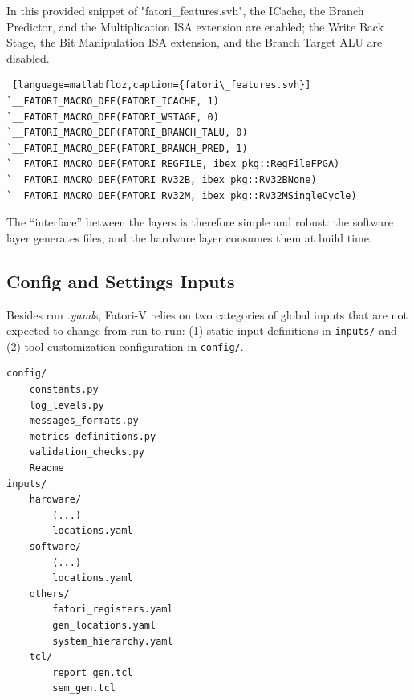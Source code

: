  In this provided snippet of "fatori\_features.svh", the ICache, the Branch Predictor, and the Multiplication ISA extension are enabled; the Write Back Stage, the Bit Manipulation ISA extension, and the Branch Target ALU are disabled.

\begin{lstlisting} [language=matlabfloz,caption={fatori\_features.svh}]
`__FATORI_MACRO_DEF(FATORI_ICACHE, 1)
`__FATORI_MACRO_DEF(FATORI_WSTAGE, 0)
`__FATORI_MACRO_DEF(FATORI_BRANCH_TALU, 0)
`__FATORI_MACRO_DEF(FATORI_BRANCH_PRED, 1)
`__FATORI_MACRO_DEF(FATORI_REGFILE, ibex_pkg::RegFileFPGA)
`__FATORI_MACRO_DEF(FATORI_RV32B, ibex_pkg::RV32BNone)
`__FATORI_MACRO_DEF(FATORI_RV32M, ibex_pkg::RV32MSingleCycle)
\end{lstlisting}

 The “interface” between the layers is therefore simple and robust: the software layer generates files, and the hardware layer consumes them at build time.


\subsection{Config and Settings Inputs}
\label{chap3:ui_config}

 Besides run \textit{.yaml}s, Fatori-V relies on two categories of global inputs that are not expected to change from run to run: (1) static input definitions in \texttt{inputs/} and (2) tool customization configuration in \texttt{config/}.

\begin{lstlisting}[basicstyle=\ttfamily\footnotesize,caption={Input and Config files, the entry point of Fatori-V}]
config/
    constants.py
    log_levels.py
    messages_formats.py
    metrics_definitions.py
    validation_checks.py
    Readme
inputs/
    hardware/
        (...)
        locations.yaml
    software/
        (...)
        locations.yaml
    others/
        fatori_registers.yaml
        gen_locations.yaml
        system_hierarchy.yaml
    tcl/
        report_gen.tcl
        sem_gen.tcl
\end{lstlisting}

